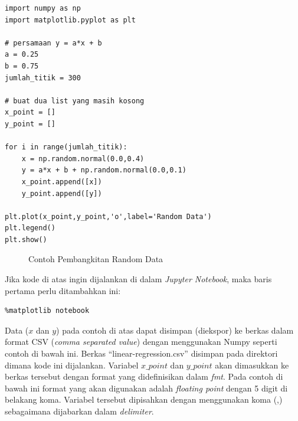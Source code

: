 \begin{verbatim}
import numpy as np
import matplotlib.pyplot as plt

# persamaan y = a*x + b
a = 0.25
b = 0.75
jumlah_titik = 300

# buat dua list yang masih kosong
x_point = []
y_point = []

for i in range(jumlah_titik):
    x = np.random.normal(0.0,0.4)
    y = a*x + b + np.random.normal(0.0,0.1)
    x_point.append([x])
    y_point.append([y])

plt.plot(x_point,y_point,'o',label='Random Data')
plt.legend()
plt.show()
\end{verbatim}


\begin{figure}[ht]
\caption{Contoh Pembangkitan Random Data}
\label{fig:randomnumpy}
\end{figure}

Jika kode di atas ingin dijalankan di dalam {\em Jupyter Notebook},
maka baris pertama perlu ditambahkan ini:

\begin{verbatim}
%matplotlib notebook
\end{verbatim}

Data ($x$ dan $y$) pada contoh di atas dapat disimpan (diekspor) ke berkas
dalam format CSV ({\em comma separated value}) dengan menggunakan Numpy
seperti contoh di bawah ini.
Berkas ``linear-regression.csv'' disimpan pada direktori dimana kode
ini dijalankan. Variabel $x\_point$ dan $y\_point$ akan dimasukkan ke
berkas tersebut dengan format yang didefinisikan dalam {\em fmt}.
Pada contoh di bawah ini format yang akan digunakan adalah 
{\em floating point} dengan 5 digit di belakang koma.
Variabel tersebut dipisahkan dengan menggunakan koma (,) sebagaimana
dijabarkan dalam {\em delimiter}.

